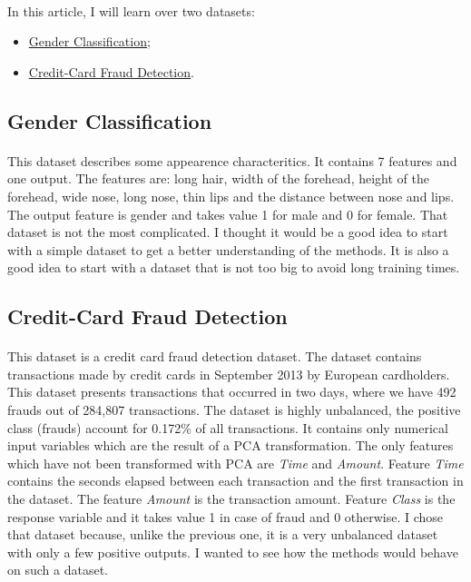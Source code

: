 \documentclass[10pt]{article}
\begin{document}
		\paragraph*{}
			In this article, I will learn over two datasets:
			\begin{itemize}
				\item \href{https://www.kaggle.com/datasets/elakiricoder/gender-classification-dataset}{Gender Classification};
				\item \href{https://www.kaggle.com/code/sngkadam/credit-card-fraud-detection/data}{Credit-Card Fraud Detection}.
			\end{itemize}
		\subsection*{Gender Classification}
			\paragraph*{}
				This dataset describes some appearence characteritics. It contains 7 features and one output. The features are: long hair, width of the forehead, height of the forehead, wide nose, long nose, thin lips and the distance between nose and lips. The output feature is gender and takes value 1 for male and 0 for female. That dataset is not the most complicated. I thought it would be a good idea to start with a simple dataset to get a better understanding of the methods. It is also a good idea to start with a dataset that is not too big to avoid long training times.
		\subsection*{Credit-Card Fraud Detection}
			\paragraph*{}
				This dataset is a credit card fraud detection dataset. The dataset contains transactions made by credit cards in September 2013 by European cardholders. This dataset presents transactions that occurred in two days, where we have 492 frauds out of 284,807 transactions. The dataset is highly unbalanced, the positive class (frauds) account for 0.172\% of all transactions. It contains only numerical input variables which are the result of a PCA transformation. The only features which have not been transformed with PCA are \textit{Time} and \textit{Amount}. Feature \textit{Time} contains the seconds elapsed between each transaction and the first transaction in the dataset. The feature \textit{Amount} is the transaction amount. Feature \textit{Class} is the response variable and it takes value 1 in case of fraud and 0 otherwise. I chose that dataset because, unlike the previous one, it is a very unbalanced dataset with only a few positive outputs. I wanted to see how the methods would behave on such a dataset.
\end{document}
